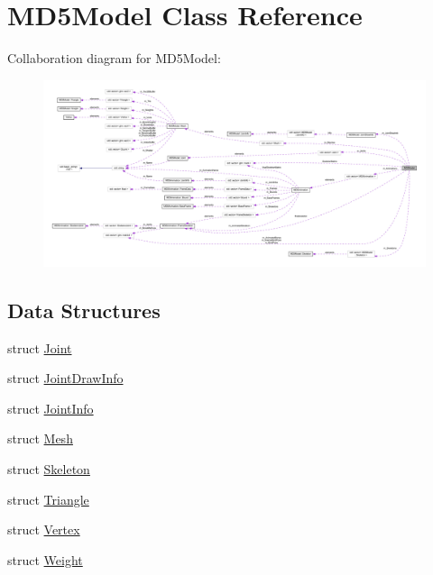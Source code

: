 \hypertarget{class_m_d5_model}{}\section{M\+D5\+Model Class Reference}
\label{class_m_d5_model}


Collaboration diagram for M\+D5\+Model\+:
\nopagebreak
\begin{figure}[H]
\begin{center}
\leavevmode
\includegraphics[width=350pt]{class_m_d5_model__coll__graph}
\end{center}
\end{figure}
\subsection*{Data Structures}
\begin{DoxyCompactItemize}
\item 
struct \hyperlink{struct_m_d5_model_1_1_joint}{Joint}
\item 
struct \hyperlink{struct_m_d5_model_1_1_joint_draw_info}{Joint\+Draw\+Info}
\item 
struct \hyperlink{struct_m_d5_model_1_1_joint_info}{Joint\+Info}
\item 
struct \hyperlink{struct_m_d5_model_1_1_mesh}{Mesh}
\item 
struct \hyperlink{struct_m_d5_model_1_1_skeleton}{Skeleton}
\item 
struct \hyperlink{struct_m_d5_model_1_1_triangle}{Triangle}
\item 
struct \hyperlink{struct_m_d5_model_1_1_vertex}{Vertex}
\item 
struct \hyperlink{struct_m_d5_model_1_1_weight}{Weight}
\end{DoxyCompactItemize}

